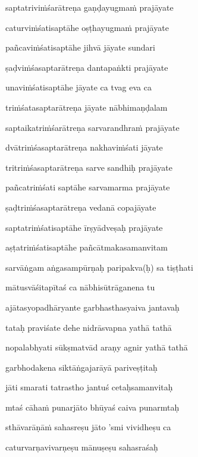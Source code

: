 saptatriviṁśarātreṇa gaṇḍayugmaṁ prajāyate \veg\dontdisplaylinenum

caturviṁśatisaptāhe oṣṭhayugmaṁ prajāyate\thinspace{\dandab} \dontdisplaylinenum

pañcaviṁśatisaptāhe jihvā jāyate sundari \veg\dontdisplaylinenum

ṣaḍviṁśasaptarātreṇa dantapaṅkti prajāyate\thinspace{\dandab} \dontdisplaylinenum

unaviṁśatisaptāhe jāyate ca tvag eva ca \veg\dontdisplaylinenum

triṁśatasaptarātreṇa jāyate nābhimaṇḍalam\thinspace{\dandab} \dontdisplaylinenum

saptaikatriṁśarātreṇa sarvarandhraṁ prajāyate \veg\dontdisplaylinenum

dvātriṁśasaptarātreṇa nakhaviṁśati jāyate\thinspace{\dandab} \dontdisplaylinenum

tritriṁśasaptarātreṇa sarve sandhiḥ prajāyate \veg\dontdisplaylinenum

pañcatriṁśati saptāhe sarvamarma prajāyate\thinspace{\dandab} \dontdisplaylinenum

ṣaḍtriṁśasaptarātreṇa vedanā copajāyate \veg\dontdisplaylinenum

saptatriṁśatisaptāhe īrṣyādveṣaḥ prajāyate\thinspace{\dandab} \dontdisplaylinenum

aṣṭatriṁśatisaptāhe pañcātmakasamanvitam \veg\dontdisplaylinenum

sarvāṅgam aṅgasampūrṇaḥ paripakva(ḥ) sa tiṣṭhati\thinspace{\dandab} \dontdisplaylinenum

mātusvāśitapītaś ca nābhisūtrāganena tu \veg\dontdisplaylinenum

ajātasyopadhāryante garbhasthasyaiva jantavaḥ\thinspace{\dandab} \dontdisplaylinenum

tataḥ praviśate dehe nidrāsvapna yathā tathā \veg\dontdisplaylinenum

nopalabhyati sūkṣmatvād araṇy agnir yathā tathā\thinspace{\dandab} \dontdisplaylinenum

garbhodakena siktāṅgajarāyā pariveṣṭitaḥ \veg\dontdisplaylinenum

jāti smarati tatrastho jantuś cetaḥsamanvitaḥ\thinspace{\dandab} \dontdisplaylinenum

mtaś cāhaṁ punarjāto bhūyaś caiva punarmtaḥ \veg\dontdisplaylinenum

sthāvarāṇāṁ sahasreṣu jāto 'smi vividheṣu ca\thinspace{\dandab} \dontdisplaylinenum

caturvarṇavivarṇeṣu mānuṣeṣu sahasraśaḥ \veg\dontdisplaylinenum

